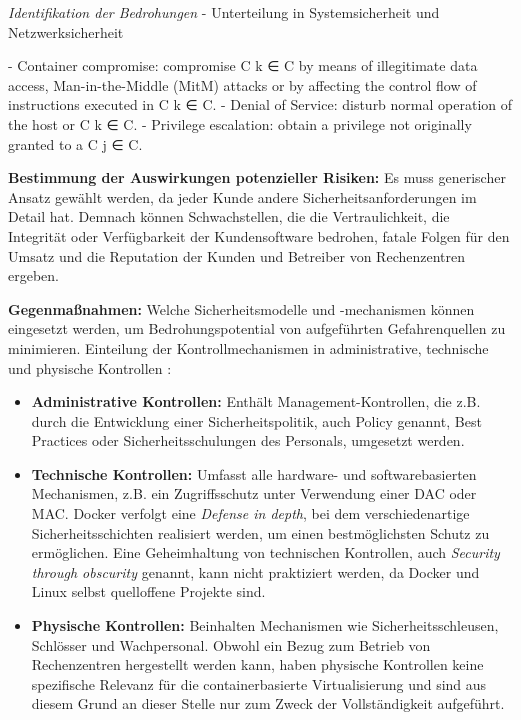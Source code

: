 \documentclass[../main.tex]{subfiles}
\begin{document}
  \emph{Identifikation der Bedrohungen}
  - Unterteilung in Systemsicherheit und Netzwerksicherheit

  - Container compromise: compromise C k ∈ C by means of illegitimate
  data access, Man-in-the-Middle (MitM) attacks or by affecting the control
  flow of instructions executed in C k ∈ C.
  - Denial of Service: disturb normal operation of the host or C k ∈ C.
  - Privilege escalation: obtain a privilege not originally granted to a C j ∈ C.


  \textbf{Bestimmung der Auswirkungen potenzieller Risiken:}
    Es muss generischer Ansatz gewählt werden, da jeder Kunde andere Sicherheitsanforderungen im Detail hat. Demnach können Schwachstellen, die die Vertraulichkeit, die Integrität oder Verfügbarkeit der Kundensoftware bedrohen, fatale Folgen für den Umsatz und die Reputation der Kunden und Betreiber von Rechenzentren ergeben.

  \textbf{Gegenmaßnahmen:} %
    Welche Sicherheitsmodelle und -mechanismen können eingesetzt werden, um Bedrohungspotential von aufgeführten Gefahrenquellen zu minimieren.
    Einteilung der Kontrollmechanismen in administrative, technische und physische Kontrollen \cite[S.40]{CISSP}:
    \begin{itemize}
      \item \textbf{Administrative Kontrollen:} Enthält Management-Kontrollen, die z.B. durch die Entwicklung einer Sicherheitspolitik, auch Policy genannt, Best Practices oder Sicherheitsschulungen des Personals, umgesetzt werden.
      \item \textbf{Technische Kontrollen:} Umfasst alle hardware- und softwarebasierten Mechanismen, z.B. ein Zugriffsschutz unter Verwendung einer DAC oder MAC. Docker verfolgt eine \emph{Defense in depth}, bei dem verschiedenartige Sicherheitsschichten realisiert werden, um einen bestmöglichsten Schutz zu ermöglichen. Eine Geheimhaltung von technischen Kontrollen, auch \emph{Security through obscurity} genannt, kann nicht praktiziert werden, da Docker und Linux selbst quelloffene Projekte sind.
      \item \textbf{Physische Kontrollen:} Beinhalten Mechanismen wie Sicherheitsschleusen, Schlösser und Wachpersonal. Obwohl ein Bezug zum Betrieb von Rechenzentren hergestellt werden kann, haben physische Kontrollen keine spezifische Relevanz für die containerbasierte Virtualisierung und sind aus diesem Grund an dieser Stelle nur zum Zweck der Vollständigkeit aufgeführt.
    \end{itemize}
\end{document}
